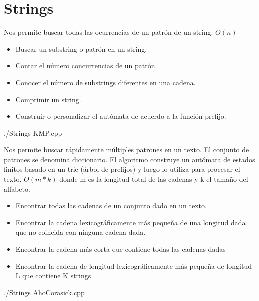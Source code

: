 \section{Strings}
\begin{multicols*}{2}
	{Nos permite buscar todas las ocurrencias de un patrón de un string.}
	{$O(n)$}
	{\begin{itemize}
			\item Buscar un substring o patrón en un string.
			\item Contar el número concurrencias de un patrón.
			\item Conocer el número de substrings diferentes en una cadena.
			\item Comprimir un string.
			\item Construir o personalizar el autómata de acuerdo a la función prefijo.
		\end{itemize}}
	{./Strings}
	{KMP.cpp}

	{Nos permite buscar rápidamente múltiples patrones en un texto. El conjunto de patrones se denomina diccionario. El algoritmo construye un autómata de estados finitos basado en un trie (árbol de prefijos) y luego lo utiliza para procesar el texto.}
	{$O(m*k)$ donde m es la longitud total de las cadenas y k el tamaño del alfabeto.}
	{\begin{itemize}
			\item Encontrar todas las cadenas de un conjunto dado en un texto.
			\item Encontrar la cadena lexicográficamente más pequeña de una longitud dada que no coincida con ninguna cadena dada.
			\item Encontrar la cadena más corta que contiene todas las cadenas dadas
			\item Encontrar la cadena de longitud lexicográficamente más pequeña de longitud L que contiene K strings
		\end{itemize}}
	{./Strings}
	{AhoCorasick.cpp}
	
\end{multicols*}